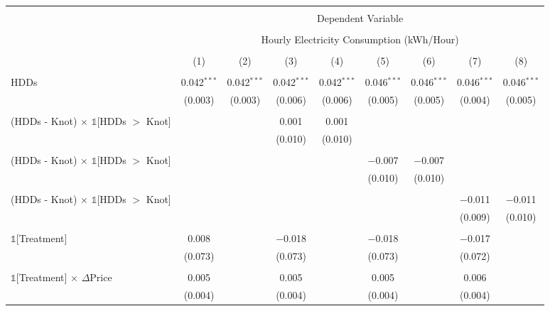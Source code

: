 
\begin{table}[!htbp] \centering 
  \label{Table:Breakdown-of-Average-Treatement-Effects-in-the-Peak-Rate-Period_As-a-Function-of-Rate-Changes} 
\tiny
\begin{longtable}{@{\extracolsep{0pt}}lcccccccc} 
\\[-1.8ex]\hline 
\hline \\[-1.8ex] 
 & \multicolumn{8}{c}{Dependent Variable} \\ 
\cline{2-9} 
\\[-1.8ex] & \multicolumn{8}{c}{Hourly Electricity Consumption  (kWh/Hour)} \\ 
\\[-1.8ex] & (1) & (2) & (3) & (4) & (5) & (6) & (7) & (8)\\ 
\hline \\[-1.8ex] \endhead
 HDDs & 0.042$^{***}$ & 0.042$^{***}$ & 0.042$^{***}$ & 0.042$^{***}$ & 0.046$^{***}$ & 0.046$^{***}$ & 0.046$^{***}$ & 0.046$^{***}$ \\ 
  & (0.003) & (0.003) & (0.006) & (0.006) & (0.005) & (0.005) & (0.004) & (0.005) \\ 
  & & & & & & & & \\ 
 (HDDs - Knot) $\times$ $\mathbb{1}$[HDDs $>$ Knot] &  &  & 0.001 & 0.001 &  &  &  &  \\ 
  &  &  & (0.010) & (0.010) &  &  &  &  \\ 
  & & & & & & & & \\ 
 (HDDs - Knot) $\times$ $\mathbb{1}$[HDDs $>$ Knot] &  &  &  &  & $-$0.007 & $-$0.007 &  &  \\ 
  &  &  &  &  & (0.010) & (0.010) &  &  \\ 
  & & & & & & & & \\ 
 (HDDs - Knot) $\times$ $\mathbb{1}$[HDDs $>$ Knot] &  &  &  &  &  &  & $-$0.011 & $-$0.011 \\ 
  &  &  &  &  &  &  & (0.009) & (0.010) \\ 
  & & & & & & & & \\ 
 $\mathbb{1}$[Treatment] & 0.008 &  & $-$0.018 &  & $-$0.018 &  & $-$0.017 &  \\ 
  & (0.073) &  & (0.073) &  & (0.073) &  & (0.072) &  \\ 
  & & & & & & & & \\ 
 $\mathbb{1}$[Treatment] $\times$ $\Delta$Price & 0.005 &  & 0.005 &  & 0.005 &  & 0.006 &  \\ 
  & (0.004) &  & (0.004) &  & (0.004) &  & (0.004) &  \\ 

\end{longtable}
\end{table}
